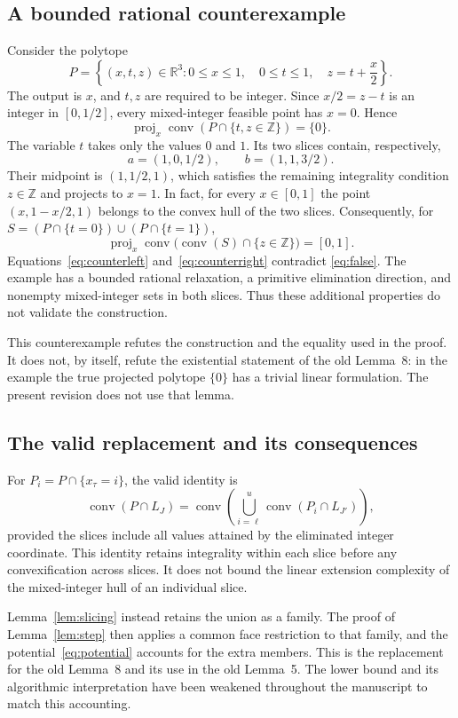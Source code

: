 \documentclass[11pt]{article}
\theoremstyle{definition}
\DeclareMathOperator{\conv}{conv}
\DeclareMathOperator{\proj}{proj}
\newcommand{\R}{\mathbb R}
\newcommand{\Z}{\mathbb Z}
\begin{document}
\subsection{A bounded rational counterexample}
Consider the polytope
\[
 P=\left\{(x,t,z)\in\R^3:
 0\leq x\leq1,\quad0\leq t\leq1,\quad z=t+\frac{x}{2}\right\}.
\]
The output is $x$, and $t,z$ are required to be integer. Since
$x/2=z-t$ is an integer in $[0,1/2]$, every mixed-integer feasible point
has $x=0$. Hence
\begin{equation}\label{eq:counterleft}
 \proj_x\conv(P\cap\{t,z\in\Z\})=\{0\}.
\end{equation}
The variable $t$ takes only the values $0$ and $1$. Its two slices contain,
respectively,
\[
 a=(1,0,1/2),\qquad b=(1,1,3/2).
\]
Their midpoint is $(1,1/2,1)$, which satisfies the remaining integrality
condition $z\in\Z$ and projects to $x=1$. In fact, for every $x\in[0,1]$
the point $(x,1-x/2,1)$ belongs to the convex hull of the two slices.
Consequently, for $S=(P\cap\{t=0\})\cup(P\cap\{t=1\})$,
\begin{equation}\label{eq:counterright}
 \proj_x\conv\bigl(\conv(S)\cap\{z\in\Z\}\bigr)=[0,1].
\end{equation}
Equations~\eqref{eq:counterleft} and~\eqref{eq:counterright} contradict
\eqref{eq:false}. The example has a bounded rational relaxation, a primitive
elimination direction, and nonempty mixed-integer sets in both slices.
Thus these additional properties do not validate the construction.

This counterexample refutes the construction and the equality used in the
proof. It does not, by itself, refute the existential statement of the old
Lemma~8: in the example the true projected polytope $\{0\}$ has a trivial
linear formulation. The present revision does not use that lemma.

\subsection{The valid replacement and its consequences}
For $P_i=P\cap\{x_\tau=i\}$, the valid identity is
\[
 \conv(P\cap L_J)
 =\conv\left(\bigcup_{i=\ell}^{u}
       \conv(P_i\cap L_{J'})\right),
\]
provided the slices include all values attained by the eliminated integer
coordinate. This identity retains integrality within each slice before any
convexification across slices. It does not bound the linear extension
complexity of the mixed-integer hull of an individual slice.

Lemma~\ref{lem:slicing} instead retains the union as a family. The proof
of Lemma~\ref{lem:step} then applies a common face restriction to that
family, and the potential~\eqref{eq:potential} accounts for the extra
members. This is the replacement for the old Lemma~8 and its use in the
old Lemma~5. The lower bound and its algorithmic interpretation have been
weakened throughout the manuscript to match this accounting.
\end{document}
